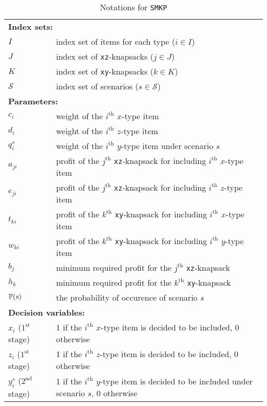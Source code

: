 \begin{table}[H]
	\caption{Notations for \texttt{SMKP}}
	\label{smkp:notation}
	\resizebox{\textwidth}{!}
	{
		\begin{tabular}{ll}
			\toprule
			\multicolumn{2}{l}{\textbf{Index sets:}} \\
			$I$ &  index set of items for each type ($i\in I$)\\ 
			$J$ &  index set of \texttt{xz}-knapsacks ($j \in J$)\\ 
			$K$ &  index set of \texttt{xy}-knapsacks ($k \in K$)\\
			$\mathcal{S}$ & index set of scenarios ($s\in \mathcal{S}$)\\ \midrule
			\multicolumn{2}{l}{\textbf{Parameters:}} \\
			$c_{i}$ 	& weight of the $i^{\mathrm{th}}$ $x$-type item 		\\ 
			$d_{i}$ 	& weight of the $i^{\mathrm{th}}$ $z$-type item  		\\ 
			$q_{i}^{s}$ & weight of the $i^{\mathrm{th}}$ $y$-type item under scenario $s$ 		\\ 
			$a_{ji}$	& profit of the $j^{\mathrm{th}}$ \texttt{xz}-knapsack for including $i^{\mathrm{th}}$ $x$-type item		\\
			$e_{ji}$	& profit of the $j^{\mathrm{th}}$ \texttt{xz}-knapsack for including $i^{\mathrm{th}}$ $z$-type item		\\
			$t_{ki}$	& profit of the $k^{\mathrm{th}}$ \texttt{xy}-knapsack for including $i^{\mathrm{th}}$ $x$-type item	\\
			$w_{ki}$	& profit of the $k^{\mathrm{th}}$ \texttt{xy}-knapsack for including $i^{\mathrm{th}}$ $y$-type item		\\
			$b_j$		& minimum required profit for the $j^{\mathrm{th}}$ \texttt{xz}-knapsack		\\
			$h_k$		& minimum required profit for the $k^{\mathrm{th}}$ \texttt{xy}-knapsack		\\
			$\operatorname*{\mathbb{P}}(s)$ 	& \textrm{the probability of occurence of scenario $s$} \\ \midrule
			\multicolumn{2}{l}{\textbf{Decision variables:}} \\
			$x_{i}$ ($1^{\textrm{st}}$ stage) & 1 if the $i^{\mathrm{th}}$ $x$-type item is decided to be included, 0 otherwise \\ 
			$z_{i}$ ($1^{\textrm{st}}$ stage) & 1 if the $i^{\mathrm{th}}$ $z$-type item is decided to be included, 0 otherwise \\ 
			$y_{i}^s$ ($2^{\textrm{nd}}$ stage)& 1 if the $i^{\mathrm{th}}$ $y$-type item is decided to be included under scenario $s$, 0 otherwise  \\
			\bottomrule
		\end{tabular}
	}
\end{table} 

